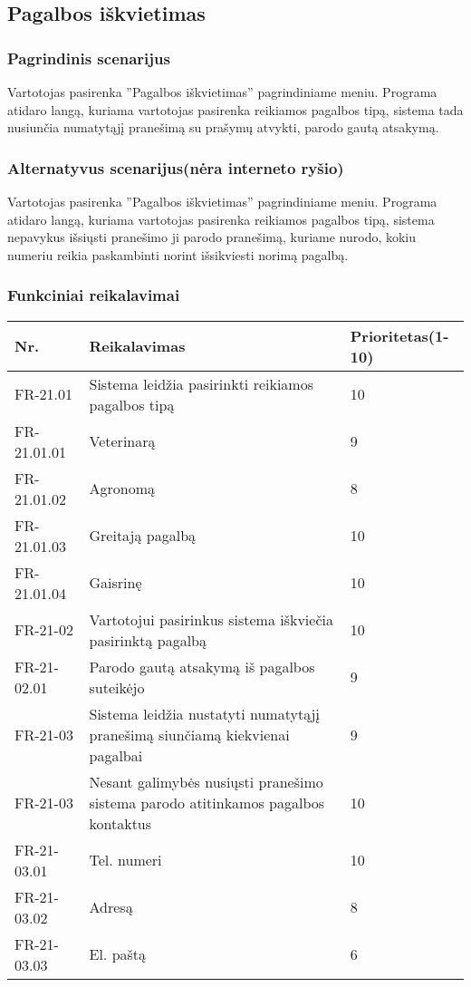 \documentclass[oneside]{VUMIFPSkursinis}
\begin{document}
\subsection{Pagalbos iškvietimas}
	\subsubsection{Pagrindinis scenarijus}
	Vartotojas pasirenka ''Pagalbos iškvietimas'' pagrindiniame meniu. Programa atidaro langą, kuriama vartotojas pasirenka reikiamos pagalbos tipą, sistema tada nusiunčia numatytąjį pranešimą su prašymų atvykti, parodo gautą atsakymą.
	\subsubsection{Alternatyvus scenarijus(nėra interneto ryšio)}
	Vartotojas pasirenka ''Pagalbos iškvietimas'' pagrindiniame meniu. Programa atidaro langą, kuriama vartotojas pasirenka reikiamos pagalbos tipą, sistema nepavykus išsiųsti pranešimo ji parodo pranešimą, kuriame nurodo, kokiu numeriu reikia paskambinti norint išsikviesti norimą pagalbą.
	\subsubsection{Funkciniai reikalavimai}
	\begin{table}[htbp]
		\begin{tabularx}{1\textwidth}{ |P{2.5cm}|X|P{3cm }| }  \hline
			Nr. & Reikalavimas & Prioritetas(1-10) \\ \hline
			FR-21.01 & Sistema leidžia pasirinkti reikiamos pagalbos tipą & 10 \\ \hline
			FR-21.01.01 & Veterinarą & 9 \\ \hline
			FR-21.01.02 & Agronomą & 8 \\ \hline
			FR-21.01.03 & Greitają pagalbą & 10 \\ \hline
			FR-21.01.04 & Gaisrinę & 10 \\ \hline
			FR-21-02 & Vartotojui pasirinkus sistema iškviečia pasirinktą pagalbą & 10 \\ \hline	
			FR-21-02.01 & Parodo gautą atsakymą iš pagalbos suteikėjo & 9 \\ \hline
			FR-21-03 & Sistema leidžia nustatyti numatytąjį pranešimą siunčiamą kiekvienai pagalbai & 9 \\ \hline	
			FR-21-03 & Nesant galimybės nusiųsti pranešimo sistema parodo atitinkamos pagalbos kontaktus & 10 \\ \hline	
			FR-21-03.01 & Tel. numeri & 10 \\ \hline	
			FR-21-03.02 & Adresą & 8 \\ \hline	
			FR-21-03.03 & El. paštą & 6 \\ \hline						
		\end{tabularx}
	\end{table}
\end{document}
